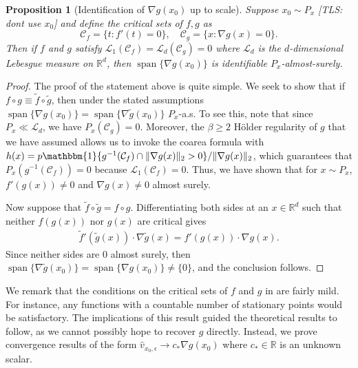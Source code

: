 \documentclass[11pt]{article}
\newtheorem{prop}[thm]{Proposition}
\newcommand{\tls}[1]{{\color{cyan}[TLS: #1]}}
\begin{document}
\begin{prop}[Identification of $\nabla g(x_0)$ up to scale]\label{identification}
    Suppose $x_0 \sim P_x$ \tls{dont use $x_0$} and define the critical sets of $f, g$ as
    \[\mathcal{C}_f = \{t : f'(t) = 0\}, \quad \mathcal{C}_g = \{x : \nabla g(x) =0\}.\]
    Then if $f$ and $g$ satisfy $\mathcal{L}_1(\mathcal{C}_f) = \mathcal{L}_d(\mathcal{C}_g) = 0$ where $\mathcal{L}_d$ is the $d$-dimensional Lebesgue measure on $\mathbb{R}^d$, then $\operatorname{span}\{\nabla g(x_0)\}$ is identifiable $P_x$-almost-surely.
\end{prop}
\begin{proof}
    The proof of the statement above is quite simple. We seek to show that if $f \circ g \equiv \tilde f \circ \tilde g$, then under the stated assumptions $\operatorname{span}\{\nabla g(x_0)\} = \operatorname{span}\{\nabla \tilde g(x_0)\}$ $P_x$-a.s. To see this, note that since $P_x \ll \mathcal{L}_d$, we have $P_x(\mathcal{C}_g) = 0.$ Moreover, the $\beta \geq 2$ H\"older regularity of $g$ that we have assumed allows us to invoke the coarea formula \citep[Theorem 3.2.22]{federer1959curvature} with $h(x) = p\mathbbm{1}\{g^{-1}(\mathcal C_f) \cap \|\nabla g(x)\|_2 > 0\}/\|\nabla g(x)\|_2$, which guarantees that $P_x(g^{-1}(\mathcal{C}_f)) = 0$ because $\mathcal{L}_1(\mathcal{C}_f) = 0.$ Thus, we have shown that for $x \sim P_x$, $f'(g(x)) \neq 0 $ and $\nabla g(x) \neq 0$ almost surely.

    Now suppose that $\tilde f \circ \tilde g = f \circ g$. Differentiating both sides at an $x \in \mathbb{R}^d$ such that neither $f(g(x))$ nor $g(x)$ are critical gives
    \begin{align*}
        \tilde f'(\tilde g(x)) \cdot \nabla \tilde g(x) = f'(g(x)) \cdot \nabla g(x).
    \end{align*}
    Since neither sides are $0$ almost surely, then $\operatorname{span}\{\nabla \tilde g(x_0)\} = \operatorname{span}\{\nabla g(x_0)\} \neq \{0\}$, and the conclusion follows. 
\end{proof}

We remark that the conditions on the critical sets of $f$ and $g$ in  are fairly mild. For instance, any functions with a countable number of stationary points would be satisfactory. The implications of this result guided the theoretical results to follow, as we cannot possibly hope to recover $g$ directly. Instead, we prove convergence results of the form $\hat v_{x_0, \epsilon} \to c_*\nabla g(x_0)$ where $c_* \in \mathbb{R}$ is an unknown scalar.
\end{document}
